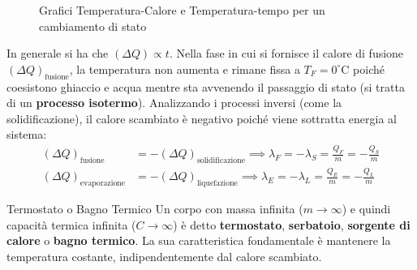 \begin{figure}[ht]
\centering
{}
\caption{Grafici Temperatura-Calore e Temperatura-tempo per un cambiamento di stato}
\end{figure}

In generale si ha che $(\Delta Q) \propto t$.
Nella fase in cui si fornisce il calore di fusione $(\Delta Q)_{\text{fusione}}$, la temperatura non aumenta e rimane fissa a $T_F = 0^\circ\text{C}$ poiché coesistono ghiaccio e acqua mentre sta avvenendo il passaggio di stato (si tratta di un \textbf{processo isotermo}).
Analizzando i processi inversi (come la solidificazione), il calore scambiato è negativo poiché viene sottratta energia al sistema:
\begin{align}
(\Delta Q)_{\text{fusione}} &= -(\Delta Q)_{\text{solidificazione}} \implies \lambda_F = -\lambda_S = \frac{Q_F}{m} = -\frac{Q_S}{m} \\
(\Delta Q)_{\text{evaporazione}} &= -(\Delta Q)_{\text{liquefazione}} \implies \lambda_E = -\lambda_L = \frac{Q_E}{m} = -\frac{Q_L}{m}
\end{align}

\begin{definizione}{Termostato o Bagno Termico}
Un corpo con massa infinita ($m \to \infty$) e quindi capacità termica infinita ($C \to \infty$) è detto \textbf{termostato}, \textbf{serbatoio}, \textbf{sorgente di calore} o \textbf{bagno termico}. 
La sua caratteristica fondamentale è mantenere la temperatura costante, indipendentemente dal calore scambiato.
\end{definizione}

